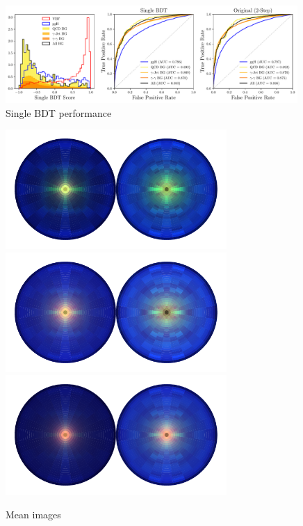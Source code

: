 %
\begin{figure}[h!]
    \includegraphics[width=0.99\textwidth]{figures/appendix_VBFLPS/dijet_BDT_LPS_unw.pdf}
    \caption{Single BDT performance}
    \label{fig:vbf_lps_appendix:single_BDT}
\end{figure}
%
\begin{figure}[h!]
    \includegraphics[width=0.75\textwidth]{figures/appendix_VBFLPS/mean_vbf_LPS_uw.pdf}
    \includegraphics[width=0.75\textwidth]{figures/appendix_VBFLPS/mean_ggh_LPS_uw.pdf}
    \includegraphics[width=0.75\textwidth]{figures/appendix_VBFLPS/mean_bkg_LPS_uw.pdf}
    \caption{Mean images}
    \label{fig:vbf_lps_appendix:mean_jet_image}
\end{figure}

